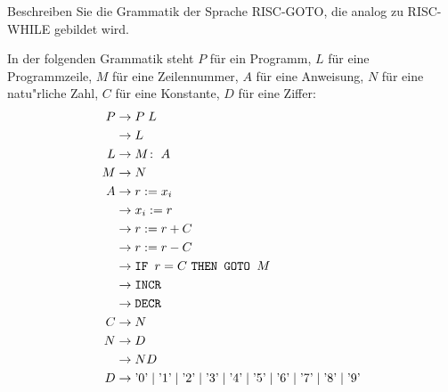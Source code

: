 Beschreiben Sie die Grammatik der Sprache RISC-GOTO, die analog zu
RISC-WHILE gebildet wird.


\begin{loesung}
In der folgenden Grammatik steht $P$ für ein Programm, $L$ für
eine Programmzeile, $M$ für eine Zeilennummer, $A$ für eine
Anweisung, $N$ für eine natu"rliche Zahl, $C$ für eine Konstante,
$D$ für eine Ziffer:
\begin{align*}
P&\rightarrow P\; L\\
 &\rightarrow L\\
L&\rightarrow M\colon \; A\\
M&\rightarrow N\\
A&\rightarrow r := x_i\\
 &\rightarrow x_i := r\\
 &\rightarrow r := r + C\\
 &\rightarrow r := r - C\\
 &\rightarrow \text{\tt IF } r = C \text{ \tt THEN GOTO } M\\
 &\rightarrow \texttt{INCR}\\
 &\rightarrow \texttt{DECR}\\
C&\rightarrow N\\
N&\rightarrow D\\
 &\rightarrow ND\\
D&\rightarrow
\text{'0'}\mid
\text{'1'}\mid
\text{'2'}\mid
\text{'3'}\mid
\text{'4'}\mid
\text{'5'}\mid
\text{'6'}\mid
\text{'7'}\mid
\text{'8'}\mid
\text{'9'}
\end{align*}
\end{loesung}
